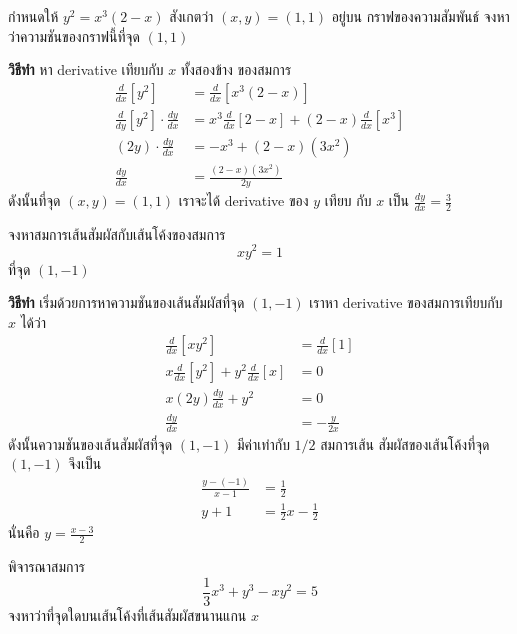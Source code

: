 \documentclass[
]{book}
\begin{document}
กำหนดให้ \(y^2 = x^3(2-x)\) สังเกตว่า \((x,y) = (1,1)\) อยู่บน
กราฟของความสัมพันธ์ จงหาว่าความชันของกราฟนี้ที่จุด \((1,1)\)

\textbf{วิธีทำ} หา derivative เทียบกับ \(x\) ทั้งสองข้าง ของสมการ
\begin{equation}   \begin{aligned}
    \frac{d}{dx}[y^2] &= \frac{d}{dx}[x^3(2-x)] \\
    \frac{d}{dy}[y^2] \cdot \frac{dy}{dx} &= x^3\frac{d}{dx}[2-x] + (2-x)\frac{d}{dx}[x^3] \\
    (2y) \cdot \frac{dy}{dx} &= -x^3 + (2-x)(3x^2) \\
    \frac{dy}{dx} &= \frac{(2-x)(3x^2)}{2y}
  \end{aligned} \end{equation} ดังนั้นที่จุด \((x,y) = (1,1)\) เราจะได้
derivative ของ \(y\) เทียบ กับ \(x\) เป็น
\(\displaystyle \frac{dy}{dx} = \frac{3}{2}\)

จงหาสมการเส้นสัมผัสกับเส้นโค้งของสมการ \[xy^2 = 1\] ที่จุด \((1,-1)\)

\textbf{วิธีทำ} เริ่มด้วยการหาความชันของเส้นสัมผัสที่จุด \((1,-1)\) เราหา derivative
ของสมการเทียบกับ \(x\) ได้ว่า \begin{equation}   \begin{aligned}
    \frac{d}{dx}[xy^2] &= \frac{d}{dx}[1] \\
    x\frac{d}{dx}[y^2] + y^2\frac{d}{dx}[x] &= 0 \\
    x(2y)\frac{dy}{dx} + y^2 &= 0 \\
    \frac{dy}{dx} &= -\frac{y}{2x}
  \end{aligned} \end{equation} ดังนั้นความชันของเส้นสัมผัสที่จุด \((1,-1)\)
มีค่าเท่ากับ \(1/2\) สมการเส้น สัมผัสของเส้นโค้งที่จุด \((1,-1)\) จึงเป็น
\begin{equation}   \begin{aligned}
    \frac{y-(-1)}{x-1} &= \frac{1}{2} \\
    y+1 &= \frac{1}{2}x -\frac{1}{2}
  \end{aligned} \end{equation} นั่นคือ \(\displaystyle y=\frac{x-3}{2}\)

พิจารณาสมการ \[\frac{1}{3}x^3+y^3-xy^2 = 5\]
จงหาว่าที่จุดใดบนเส้นโค้งที่เส้นสัมผัสขนานแกน \(x\)
\end{document}
